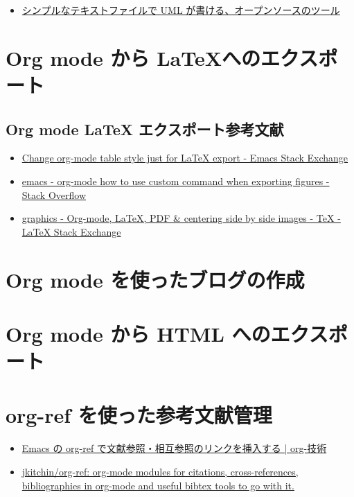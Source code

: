 \documentclass[a4j,12pt,openany,uplatex,dvipdfmx]{jsbook}
\begin{document}
\begin{itemize}
\item \href{https://plantuml.com/ja/}{シンプルなテキストファイルで UML が書ける、オープンソースのツール}
\end{itemize}


\begin{center}

\end{center}


\chapter{Org mode から \LaTeX へのエクスポート}
\label{sec:org3b2651c}
\index{\LaTeX}



\section{Org mode  \LaTeX{} エクスポート参考文献}
\label{sec:org1d54f5d}
\begin{itemize}
\item \href{https://emacs.stackexchange.com/questions/26179/change-org-mode-table-style-just-for-latex-export}{Change org-mode table style just for \LaTeX{} export - Emacs Stack Exchange}
\item \href{https://stackoverflow.com/questions/50573322/org-mode-how-to-use-custom-command-when-exporting-figures}{emacs - org-mode how to use custom command when exporting figures - Stack Overflow}
\item \href{https://tex.stackexchange.com/questions/348286/org-mode-latex-pdf-centering-side-by-side-images}{graphics - Org-mode, \LaTeX{}, PDF \& centering side by side images - \TeX{} - \LaTeX{} Stack Exchange}
\end{itemize}


\chapter{Org mode を使ったブログの作成}
\label{sec:org7183907}
\chapter{Org mode から HTML へのエクスポート}
\label{sec:org05cfc30}


\chapter{org-ref を使った参考文献管理}
\label{sec:orgd1ba470}
\begin{itemize}
\item \href{https://org-technology.com/posts/org-ref.html}{Emacs の org-ref で文献参照・相互参照のリンクを挿入する | org-技術}
\item \href{https://github.com/jkitchin/org-ref}{jkitchin/org-ref: org-mode modules for citations, cross-references, bibliographies in org-mode and useful bibtex tools to go with it.}
\end{itemize}
\end{document}
